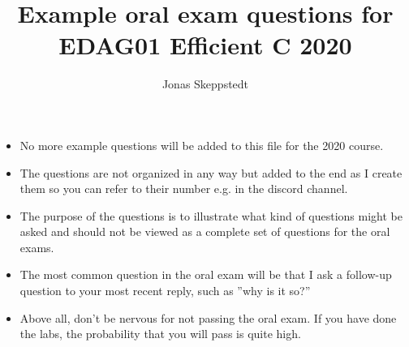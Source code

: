 \documentclass{article}
\author{Jonas Skeppstedt}
\title{\large \bf Example oral exam questions for EDAG01 Efficient C 2020}
\begin{document}
\maketitle

\begin{itemize}
\item No more example questions will be added to this file for the 2020 course.
\item The questions are not organized in any way but added to the end as I create them so you can refer to their number e.g. in the discord channel.
\item The purpose of the questions is to illustrate what kind of questions might be asked and should not be viewed
as a complete set of questions for the oral exams.
\item The most common question in the oral exam will be that I ask a follow-up question to your most recent reply, such as ''why is it so?''
\item Above all, don't be nervous for not passing the oral exam. If you have done the labs, the probability that you will pass is quite high.
\end{itemize}
\end{document}
